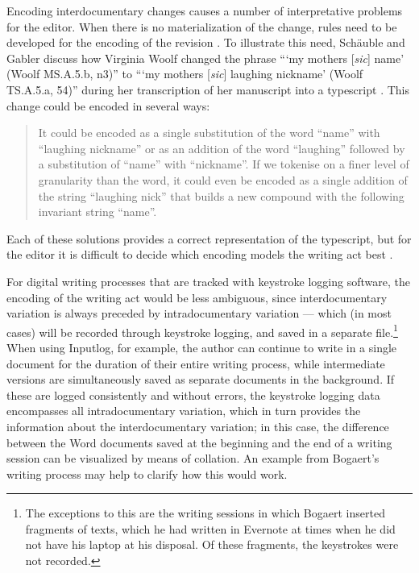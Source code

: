 \begin{paper}
Encoding interdocumentary changes causes a number of interpretative
problems for the editor. When there is no materialization of the change,
rules need to be developed for the encoding of the revision \citep[171]{schauble_encodings_2018}. To illustrate this need, Schäuble and Gabler
discuss how Virginia Woolf changed the phrase ```my mothers
[\emph{sic}] name' (Woolf MS.A.5.b, n3)'' to ```my mothers
[\emph{sic}] laughing nickname' (Woolf TS.A.5.a, 54)'' during her
transcription of her manuscript into a typescript \citep[171]{schauble_encodings_2018}.
This change could be encoded in several ways: 

\begin{quote}
It could be encoded as a
single substitution of the word ``name'' with ``laughing nickname'' or as an
addition of the word ``laughing'' followed by a substitution of ``name''
with ``nickname''. If we tokenise on a finer level of granularity than the
word, it could even be encoded as a single addition of the string
``laughing nick'' that builds a new compound with the following invariant
string ``name''.
\begin{flushright}
\citep[171]{schauble_encodings_2018}
\end{flushright} 
\end{quote}

\noindent Each of these solutions provides a
correct representation of the typescript, but for the editor it is
difficult to decide which encoding models the writing act best \citep[171]{schauble_encodings_2018}.


For digital writing processes that are tracked with
keystroke logging software, the encoding of the writing act would be
less ambiguous, since interdocumentary variation is always preceded by
intradocumentary variation --- which (in most cases) will be recorded
through keystroke logging, and saved in a separate file.\footnote{The
  exceptions to this are the writing sessions in which Bogaert inserted
  fragments of texts, which he had written in Evernote at times when he
  did not have his laptop at his disposal. Of these fragments, the
  keystrokes were not recorded.} When using Inputlog, for example, the author can continue to write in a single
document for the duration of their entire writing process, while
intermediate versions are simultaneously saved as separate documents in the background.
If these are logged consistently and without errors, the keystroke
logging data encompasses all intradocumentary variation, which in turn
provides the information about the interdocumentary variation; in this
case, the difference between the Word documents saved at the beginning
and the end of a writing session can be visualized by means of
collation. An example from Bogaert's writing process may help to clarify
how this would work.


\end{paper}
